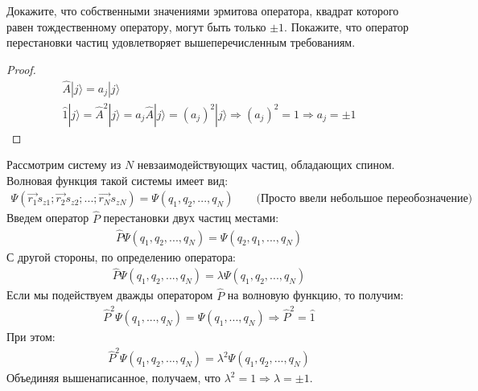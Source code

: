 \documentclass[__main__.tex]{subfiles}
\begin{document}
Докажите, что собственными значениями эрмитова оператора, квадрат которого равен тождественному оператору, могут быть только $\pm 1$. Покажите, что оператор перестановки частиц удовлетворяет вышеперечисленным требованиям.\\ 

\begin{proof}
\begin{gather*}
\hat{A}|j\rangle = a_j|j\rangle\\
\hat{1}|j\rangle =\hat{A}^2|j\rangle = a_j\hat{A}|j\rangle = (a_j)^2|j\rangle \Longrightarrow (a_j)^2=1 \Longrightarrow a_j=\pm 1
\end{gather*}
\end{proof}


Рассмотрим систему из $N$ невзаимодействующих частиц, обладающих спином. Волновая функция такой системы имеет вид:
\begin{gather*}
\Psi(\vec{r_1}s_{z1}; \vec{r_2}s_{z2};...; \vec{r_N}s_{zN}) = \Psi(q_1, q_2, ..., q_N) \qquad \text{(Просто ввели небольшое переобозначение)}
\end{gather*}
Введем оператор $\hat{P}$ перестановки двух частиц местами:
\begin{gather*}
\hat{P}\Psi(q_1, q_2, ..., q_N)=\Psi(q_2, q_1, ..., q_N)
\end{gather*}
С другой стороны, по определению оператора:
\begin{gather*}
\hat{P}\Psi(q_1, q_2, ..., q_N)=\lambda \Psi(q_1, q_2, ..., q_N)
\end{gather*}
Если мы подействуем дважды оператором $\hat{P}$ на волновую функцию, то получим:
\begin{gather*}
\hat{P}^2\Psi(q_1, ..., q_N)=\Psi (q_1, ..., q_N) \Longrightarrow \hat{P}^2=\hat{1}
\end{gather*}
При этом:
\begin{gather*}
\hat{P}^2\Psi(q_1, q_2, ..., q_N)=\lambda^2 \Psi(q_1, q_2, ..., q_N)
\end{gather*}
Объединяя вышенаписанное, получаем, что $\lambda^2=1 \Longrightarrow \lambda=\pm 1$.
\end{document}
